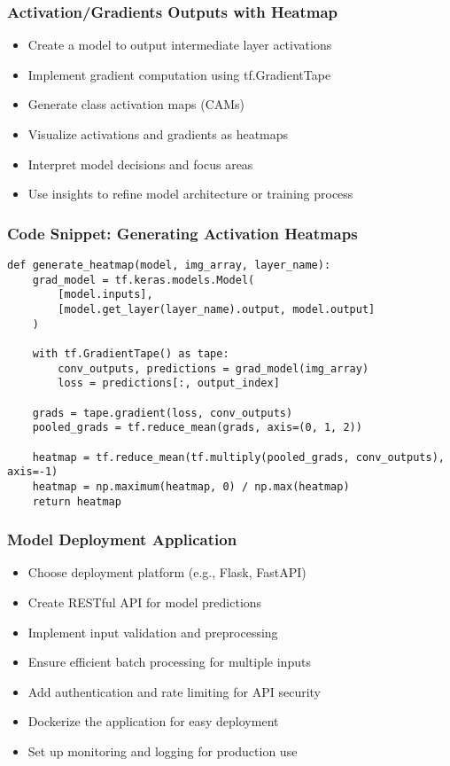 \begin{frame}[fragile]\frametitle{Activation/Gradients Outputs with Heatmap}
\begin{itemize}
\item Create a model to output intermediate layer activations
\item Implement gradient computation using tf.GradientTape
\item Generate class activation maps (CAMs)
\item Visualize activations and gradients as heatmaps
\item Interpret model decisions and focus areas
\item Use insights to refine model architecture or training process
\end{itemize}
\end{frame}

\begin{frame}[fragile]\frametitle{Code Snippet: Generating Activation Heatmaps}
\begin{lstlisting}
def generate_heatmap(model, img_array, layer_name):
    grad_model = tf.keras.models.Model(
        [model.inputs], 
        [model.get_layer(layer_name).output, model.output]
    )
    
    with tf.GradientTape() as tape:
        conv_outputs, predictions = grad_model(img_array)
        loss = predictions[:, output_index]
    
    grads = tape.gradient(loss, conv_outputs)
    pooled_grads = tf.reduce_mean(grads, axis=(0, 1, 2))
    
    heatmap = tf.reduce_mean(tf.multiply(pooled_grads, conv_outputs), axis=-1)
    heatmap = np.maximum(heatmap, 0) / np.max(heatmap)
    return heatmap
\end{lstlisting}
\end{frame}

\begin{frame}[fragile]\frametitle{Model Deployment Application}
\begin{itemize}
\item Choose deployment platform (e.g., Flask, FastAPI)
\item Create RESTful API for model predictions
\item Implement input validation and preprocessing
\item Ensure efficient batch processing for multiple inputs
\item Add authentication and rate limiting for API security
\item Dockerize the application for easy deployment
\item Set up monitoring and logging for production use
\end{itemize}
\end{frame}

